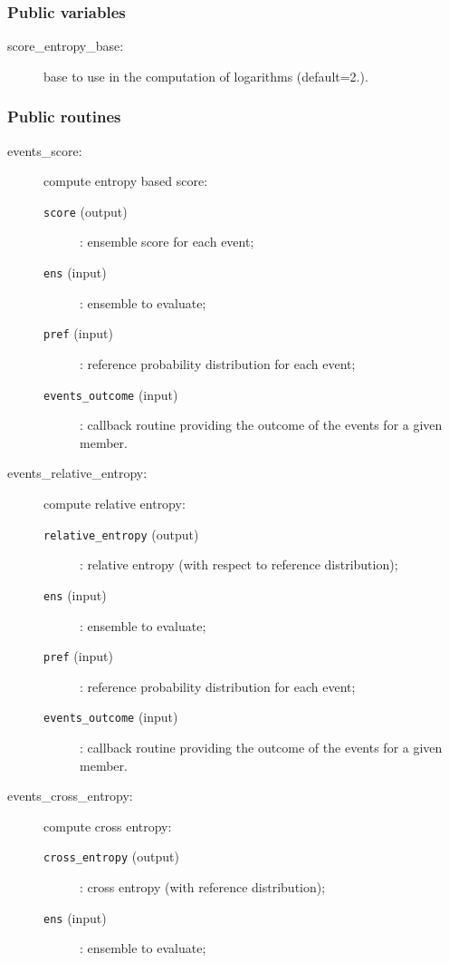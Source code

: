 \documentclass[11pt]{article}
\begin{document}
\subsubsection*{Public variables}

\begin{description}
\item[score\_entropy\_base:] base to use in the computation of logarithms (default=2.).
\end{description}

\subsubsection*{Public routines}

\begin{description}
\item[events\_score:] compute entropy based score:
  \begin{description}
  \item[{\tt score} (output)]: ensemble score for each event;
  \item[{\tt ens} (input)]: ensemble to evaluate;
  \item[{\tt pref} (input)]: reference probability distribution for each event;
  \item[{\tt events\_outcome} (input)]: callback routine providing the outcome
                                        of the events for a given member.
  \end{description}
\item[events\_relative\_entropy:] compute relative entropy:
  \begin{description}
  \item[{\tt relative\_entropy} (output)]: relative entropy (with respect to reference distribution);
  \item[{\tt ens} (input)]: ensemble to evaluate;
  \item[{\tt pref} (input)]: reference probability distribution for each event;
  \item[{\tt events\_outcome} (input)]: callback routine providing the outcome
                                        of the events for a given member.
  \end{description}
\item[events\_cross\_entropy:] compute cross entropy:
  \begin{description}
  \item[{\tt cross\_entropy} (output)]: cross entropy (with reference distribution);
  \item[{\tt ens} (input)]: ensemble to evaluate;

\end{description}
\end{description}
\end{document}

